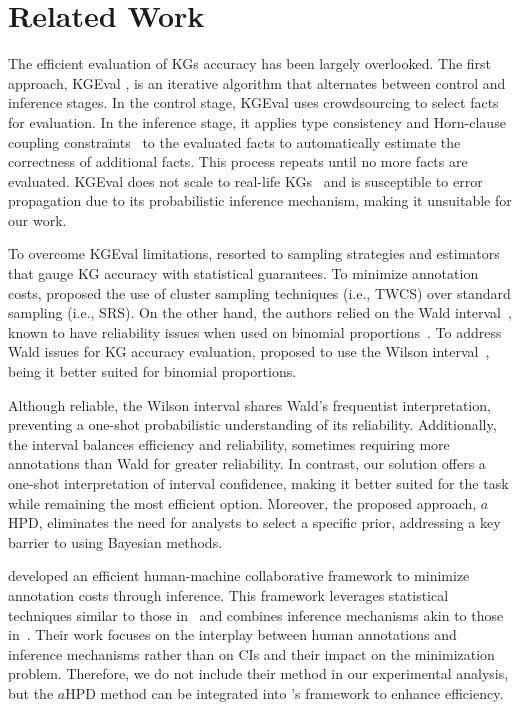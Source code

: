 \section{Related Work}
\label{sec:relatedWork}

The efficient evaluation of \acp{KG} accuracy has been largely overlooked. The first approach, KGEval \cite{ojha_talukdar-2017}, is an iterative algorithm that alternates between control and inference stages. In the control stage, KGEval uses crowdsourcing to select facts for evaluation. In the inference stage, it applies type consistency and Horn-clause coupling constraints~\cite{mitchell_etal-2018,lao_etal-2011} to the evaluated facts to automatically estimate the correctness of additional facts. This process repeats until no more facts are evaluated. KGEval does not scale to real-life \acp{KG}~\cite{gao_etal-2019} and is susceptible to error propagation due to its probabilistic inference mechanism, making it unsuitable for our work.

To overcome KGEval limitations, \citet{gao_etal-2019} resorted to sampling strategies and estimators that gauge \ac{KG} accuracy with statistical guarantees. To minimize annotation costs, \cite{gao_etal-2019} proposed the use of cluster sampling techniques (i.e., \ac{TWCS}) over standard sampling (i.e., \ac{SRS}). On the other hand, the authors relied on the Wald interval~\cite{casella_berger-2002}, known to have reliability issues when used on binomial proportions~\cite{brown_etal-2001,wallis-2013}. To address Wald issues for \ac{KG} accuracy evaluation, \citet{marchesin_silvello-2024} proposed to use the Wilson interval~\cite{wilson-1927}, being it better suited for binomial proportions.

Although reliable, the Wilson interval shares Wald's frequentist interpretation, preventing a one-shot probabilistic understanding of its reliability. Additionally, the interval balances efficiency and reliability, sometimes requiring more annotations than Wald for greater reliability. In contrast, our solution offers a one-shot interpretation of interval confidence, making it better suited for the task while remaining the most efficient option. Moreover, the proposed approach, $a$HPD, eliminates the need for analysts to select a specific prior, addressing a key barrier to using Bayesian methods.

\citet{qi_etal-2022} developed an efficient human-machine collaborative framework to minimize annotation costs through inference. This framework leverages statistical techniques similar to those in~\cite{gao_etal-2019} and combines inference mechanisms akin to those in~\cite{ojha_talukdar-2017}. Their work focuses on the interplay between human annotations and inference mechanisms rather than on \acp{CI} and their impact on the minimization problem. Therefore, we do not include their method in our experimental analysis, but the $a$HPD method can be integrated into \citet{qi_etal-2022}'s framework to enhance efficiency.